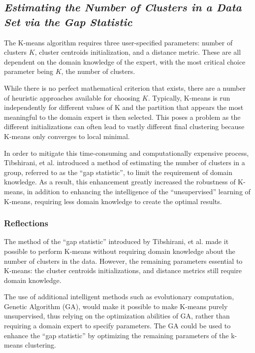 \documentclass{article}
\begin{document}
\subsection{\emph{Estimating the Number of Clusters in a Data Set via the Gap Statistic}}

The K-means algorithm requires three user-specified parameters: number of clusters $K$, cluster centroids initialization, and a distance metric\cite{tibshirani2001estimating}. These are all dependent on the domain knowledge of the expert, with the most critical choice parameter being $K$, the number of clusters.

While there is no perfect mathematical criterion that exists, there are a number of heuristic approaches available for choosing $K$. Typically, K-means is run independently for different values of K and the partition that appears the most meaningful to the domain expert is then selected. This poses a problem as the different initializations can often lead to vastly different final clustering because K-means only converges to local minimal\cite{tibshirani2001estimating}.

In order to mitigate this time-consuming and computationally expensive process, Tibshirani, et al. introduced a method of estimating the number of clusters in a group, referred to as the ``gap statistic'', to limit the requirement of domain knowledge\cite{tibshirani2001estimating}. As a result, this enhancement greatly increased the robustness of K-means, in addition to enhancing the intelligence of the ``unsupervised'' learning of K-means, requiring less domain knowledge to create the optimal results.


\subsubsection{Reflections}

The method of the ``gap statistic'' introduced by Tibshirani, et al. made it possible to perform K-means without requiring domain knowledge about the number of clusters in the data. However, the remaining parameters essential to K-means: the cluster centroids initializations, and distance metrics still require domain knowledge.

The use of additional intelligent methods such as evolutionary computation, Genetic Algorithm (GA), would make it possible to make K-means purely unsupervised, thus relying on the optimization abilities of GA, rather than requiring a domain expert to specify parameters. The GA could be used to enhance the ``gap statistic'' by optimizing the remaining parameters of the k-means clustering.
\end{document}
